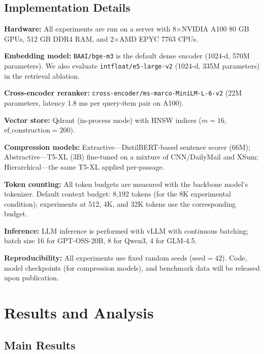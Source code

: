 \documentclass[review,12pt]{elsarticle}
\begin{document}
\subsection{Implementation Details}
\label{subsec:implementation}

\textbf{Hardware:}  All experiments are run on a server with 8$\times$NVIDIA
A100 80 GB GPUs, 512 GB DDR4 RAM, and 2$\times$AMD EPYC 7763 CPUs.

\textbf{Embedding model:}  \texttt{BAAI/bge-m3} is the default dense encoder
(1024-d, 570M parameters).  We also evaluate \texttt{intfloat/e5-large-v2}
(1024-d, 335M parameters) in the retrieval ablation.

\textbf{Cross-encoder reranker:}  \texttt{cross-encoder/ms-marco-MiniLM-L-6-v2}
(22M parameters, latency 1.8 ms per query-item pair on A100).

\textbf{Vector store:}  Qdrant (in-process mode) with HNSW indices
($m = 16$, $\text{ef\_construction} = 200$).

\textbf{Compression models:}  Extractive—DistilBERT-based sentence scorer
(66M); Abstractive—T5-XL (3B) fine-tuned on a mixture of CNN/DailyMail and
XSum; Hierarchical—the same T5-XL applied per-passage.

\textbf{Token counting:}  All token budgets are measured with the backbone
model's tokenizer.  Default context budget: 8,192 tokens (for the 8K
experimental condition); experiments at 512, 4K, and 32K tokens use the
corresponding budget.

\textbf{Inference:}  LLM inference is performed with vLLM \citep{kwon2023vllm}
with continuous batching; batch size 16 for GPT-OSS-20B, 8 for Qwen3, 4 for
GLM-4.5.

\textbf{Reproducibility:}  All experiments use fixed random seeds
($\text{seed} = 42$).  Code, model checkpoints (for compression models),
and benchmark data will be released upon publication.

\section{Results and Analysis}
\label{sec:results}

\subsection{Main Results}
\label{subsec:main-results}
\end{document}
